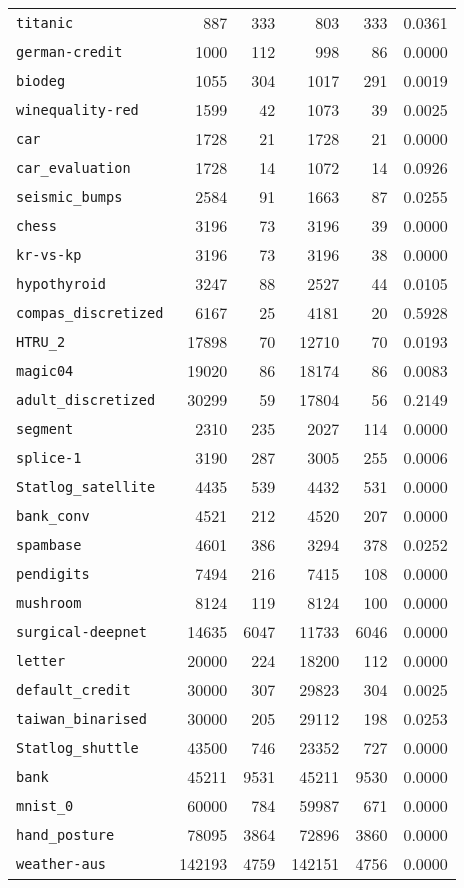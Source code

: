 \begin{tabular}{lrrrrr}
\texttt{titanic}& 887& 333& 803& 333& 0.0361\\
\texttt{german-credit}& 1000& 112& 998& 86& 0.0000\\
\texttt{biodeg}& 1055& 304& 1017& 291& 0.0019\\
\texttt{winequality-red}& 1599& 42& 1073& 39& 0.0025\\
\texttt{car}& 1728& 21& 1728& 21& 0.0000\\
\texttt{car\_evaluation}& 1728& 14& 1072& 14& 0.0926\\
\texttt{seismic\_bumps}& 2584& 91& 1663& 87& 0.0255\\
\texttt{chess}& 3196& 73& 3196& 39& 0.0000\\
\texttt{kr-vs-kp}& 3196& 73& 3196& 38& 0.0000\\
\texttt{hypothyroid}& 3247& 88& 2527& 44& 0.0105\\
\texttt{compas\_discretized}& 6167& 25& 4181& 20& 0.5928\\
\texttt{HTRU\_2}& 17898& 70& 12710& 70& 0.0193\\
\texttt{magic04}& 19020& 86& 18174& 86& 0.0083\\
\texttt{adult\_discretized}& 30299& 59& 17804& 56& 0.2149\\
\texttt{segment}& 2310& 235& 2027& 114& 0.0000\\
\texttt{splice-1}& 3190& 287& 3005& 255& 0.0006\\
\texttt{Statlog\_satellite}& 4435& 539& 4432& 531& 0.0000\\
\texttt{bank\_conv}& 4521& 212& 4520& 207& 0.0000\\
\texttt{spambase}& 4601& 386& 3294& 378& 0.0252\\
\texttt{pendigits}& 7494& 216& 7415& 108& 0.0000\\
\texttt{mushroom}& 8124& 119& 8124& 100& 0.0000\\
\texttt{surgical-deepnet}& 14635& 6047& 11733& 6046& 0.0000\\
\texttt{letter}& 20000& 224& 18200& 112& 0.0000\\
\texttt{default\_credit}& 30000& 307& 29823& 304& 0.0025\\
\texttt{taiwan\_binarised}& 30000& 205& 29112& 198& 0.0253\\
\texttt{Statlog\_shuttle}& 43500& 746& 23352& 727& 0.0000\\
\texttt{bank}& 45211& 9531& 45211& 9530& 0.0000\\
\texttt{mnist\_0}& 60000& 784& 59987& 671& 0.0000\\
\texttt{hand\_posture}& 78095& 3864& 72896& 3860& 0.0000\\
\texttt{weather-aus}& 142193& 4759& 142151& 4756& 0.0000\\
\bottomrule
\end{tabular}

